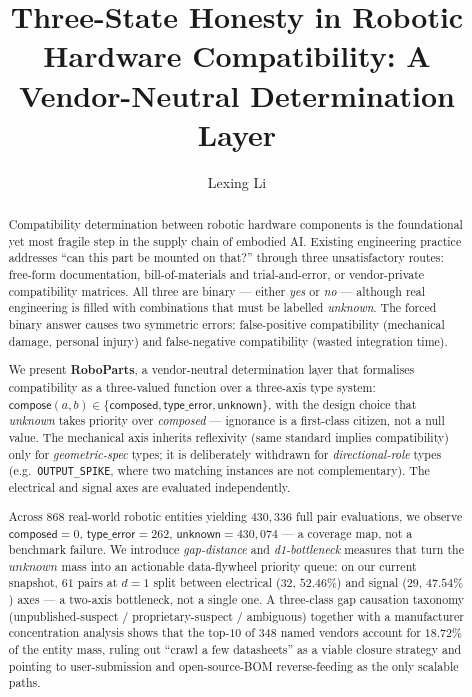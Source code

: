\documentclass[review]{elsarticle}
\begin{document}
\begin{frontmatter}

\title{Three-State Honesty in Robotic Hardware Compatibility:
       A Vendor-Neutral Determination Layer}

\author[inst1]{Lexing Li}



\begin{abstract}
Compatibility determination between robotic hardware components is the
foundational yet most fragile step in the supply chain of embodied AI.
Existing engineering practice addresses ``can this part be mounted on
that?'' through three unsatisfactory routes: free-form documentation,
bill-of-materials and trial-and-error, or vendor-private compatibility
matrices. All three are binary --- either \emph{yes} or \emph{no} ---
although real engineering is filled with combinations that must be
labelled \emph{unknown}. The forced binary answer causes two symmetric
errors: false-positive compatibility (mechanical damage, personal
injury) and false-negative compatibility (wasted integration time).

We present \textbf{RoboParts}, a vendor-neutral determination layer
that formalises compatibility as a three-valued function over a
three-axis type system:
$\mathsf{compose}(a,b) \in \{\mathsf{composed}, \mathsf{type\_error}, \mathsf{unknown}\}$,
with the design choice that \emph{unknown} takes priority over
\emph{composed} --- ignorance is a first-class citizen, not a null value.
The mechanical axis inherits reflexivity (same standard implies
compatibility) only for \emph{geometric-spec} types; it is deliberately
withdrawn for \emph{directional-role} types (e.g.\ \texttt{OUTPUT\_SPIKE},
where two matching instances are not complementary). The electrical and
signal axes are evaluated independently.

Across $868$ real-world robotic entities yielding $430{,}336$ full
pair evaluations, we observe $\mathsf{composed}=0$,
$\mathsf{type\_error}=262$, $\mathsf{unknown}=430{,}074$ --- a coverage
map, not a benchmark failure. We introduce \emph{gap-distance} and
\emph{d1-bottleneck} measures that turn the $unknown$ mass into an
actionable data-flywheel priority queue: on our current snapshot,
$61$ pairs at $d=1$ split between electrical ($32$, $52.46\%$) and
signal ($29$, $47.54\%$) axes --- a two-axis bottleneck, not a single
one. A three-class gap causation taxonomy
(unpublished-suspect / proprietary-suspect / ambiguous) together with
a manufacturer concentration analysis shows that the top-$10$ of $348$
named vendors account for $18.72\%$ of the entity mass, ruling out
``crawl a few datasheets'' as a viable closure strategy and pointing
to user-submission and open-source-BOM reverse-feeding as the only
scalable paths.
\end{abstract}


\end{frontmatter}
\end{document}
